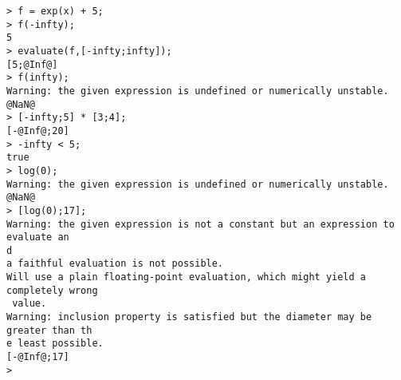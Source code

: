 \begin{center}\begin{minipage}{15cm}\begin{Verbatim}[frame=single]
> f = exp(x) + 5;
> f(-infty);
5
> evaluate(f,[-infty;infty]);
[5;@Inf@]
> f(infty);
Warning: the given expression is undefined or numerically unstable.
@NaN@
> [-infty;5] * [3;4];
[-@Inf@;20]
> -infty < 5;
true
> log(0);
Warning: the given expression is undefined or numerically unstable.
@NaN@
> [log(0);17];
Warning: the given expression is not a constant but an expression to evaluate an
d
a faithful evaluation is not possible.
Will use a plain floating-point evaluation, which might yield a completely wrong
 value.
Warning: inclusion property is satisfied but the diameter may be greater than th
e least possible.
[-@Inf@;17]
> 
\end{Verbatim}
\end{minipage}\end{center}
